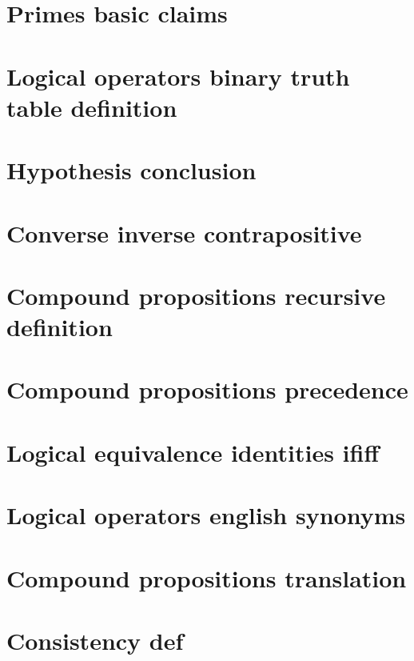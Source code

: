 \section*{Primes basic claims}

\vfill
\section*{Logical operators binary truth table definition}

\vfill
\section*{Hypothesis conclusion}

\vfill
\section*{Converse inverse contrapositive}

\vfill
\section*{Compound propositions recursive definition}

\vfill
\section*{Compound propositions precedence}

\vfill
\section*{Logical equivalence identities ififf}

\vfill
\section*{Logical operators english synonyms}

\vfill
\section*{Compound propositions translation}

\vfill
\section*{Consistency def}

\vfill
